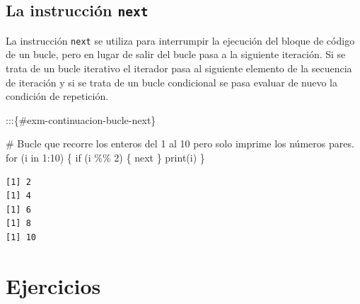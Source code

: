 \documentclass[
  a4paper,
]{scrreport}
\newenvironment{Shaded}{\begin{snugshade}}{\end{snugshade}}
\newcommand{\CommentTok}[1]{\textcolor[rgb]{0.37,0.37,0.37}{#1}}
\newcommand{\ControlFlowTok}[1]{\textcolor[rgb]{0.00,0.23,0.31}{#1}}
\newcommand{\DecValTok}[1]{\textcolor[rgb]{0.68,0.00,0.00}{#1}}
\newcommand{\FunctionTok}[1]{\textcolor[rgb]{0.28,0.35,0.67}{#1}}
\newcommand{\NormalTok}[1]{\textcolor[rgb]{0.00,0.23,0.31}{#1}}
\newcommand{\SpecialCharTok}[1]{\textcolor[rgb]{0.37,0.37,0.37}{#1}}
\theoremstyle{definition}
\theoremstyle{definition}
\theoremstyle{remark}
\begin{document}
\hypertarget{la-instrucciuxf3n-next}{%
\subsection{\texorpdfstring{La instrucción
\texttt{next}}{La instrucción next}}\label{la-instrucciuxf3n-next}}

La instrucción \texttt{next} se utiliza para interrumpir la ejecución
del bloque de código de un bucle, pero en lugar de salir del bucle pasa
a la siguiente iteración. Si se trata de un bucle iterativo el iterador
pasa al siguiente elemento de la secuencia de iteración y si se trata de
un bucle condicional se pasa evaluar de nuevo la condición de
repetición.

:::\{\#exm-continuacion-bucle-next\}

\begin{Shaded}
\begin{Highlighting}[]
\CommentTok{\# Bucle que recorre los enteros del 1 al 10 pero solo imprime los números pares.}
\ControlFlowTok{for}\NormalTok{ (i }\ControlFlowTok{in} \DecValTok{1}\SpecialCharTok{:}\DecValTok{10}\NormalTok{) \{}
  \ControlFlowTok{if}\NormalTok{ (i }\SpecialCharTok{\%\%} \DecValTok{2}\NormalTok{) \{}
    \ControlFlowTok{next}
\NormalTok{  \}}
  \FunctionTok{print}\NormalTok{(i)}
\NormalTok{\}}
\end{Highlighting}
\end{Shaded}

\begin{verbatim}
[1] 2
[1] 4
[1] 6
[1] 8
[1] 10
\end{verbatim}

\hypertarget{ejercicios-2}{%
\section{Ejercicios}\label{ejercicios-2}}
\end{document}
